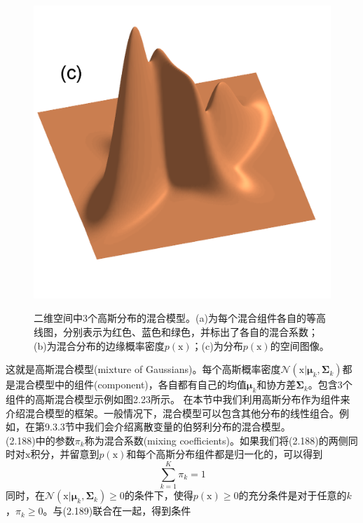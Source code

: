 \documentclass[b5paper]{book}
\numberwithin{equation}{chapter}
\newcommand {\bx} {\boldsymbol{\mathrm{x}}}
\newcommand {\bfMu} {\boldsymbol{\mu}}
\newcommand {\bfSigma} {\boldsymbol{\Sigma}}
\begin{document}
{\begin{figure}[H]
\begin{minipage}[t]{0.3\linewidth}
		\label{fig:2-23b}
		\end{minipage}
		\begin{minipage}[t]{0.3\linewidth}
		\centering
		\includegraphics[scale=0.8]{Images/2-23c.png}
		\label{fig:2-23c}
		\end{minipage}
		\caption{二维空间中3个高斯分布的混合模型。(a)为每个混合组件各自的等高线图，分别表示为红色、蓝色和绿色，并标出了各自的混合系数；(b)为混合分布的边缘概率密度$p(\bx)$；(c)为分布$p(\bx)$的空间图像。}
	\end{figure}
	这就是高斯混合模型(mixture of Gaussians)。每个高斯概率密度$\mathcal{N}(\bx|\bfMu_k, \bfSigma_k)$都是混合模型中的组件(component)，各自都有自己的均值$\bfMu_k$和协方差$\bfSigma_k$。包含3个组件的高斯混合模型示例如图2.23所示。
	\indent 在本节中我们利用高斯分布作为组件来介绍混合模型的框架。一般情况下，混合模型可以包含其他分布的线性组合。例如，在第9.3.3节中我们会介绍离散变量的伯努利分布的混合模型。\\
	\indent (2.188)中的参数$\pi_k$称为混合系数(mixing coefficients)。如果我们将(2.188)的两侧同时对$\bx$积分，并留意到$p(\bx)$和每个高斯分布组件都是归一化的，可以得到
	\begin{equation}
		\sum_{k=1}^K \pi_k = 1
	\end{equation}
	同时，在$\mathcal{N}(\bx|\bfMu_k, \bfSigma_k) \geqslant 0$的条件下，使得$p(\bx)\geqslant 0$的充分条件是对于任意的$k$，$\pi_k \geqslant 0$。与(2.189)联合在一起，得到条件
}
\end{document}
